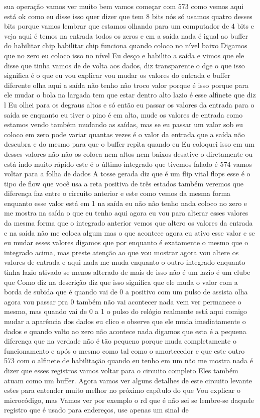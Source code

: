 \documentclass[oneside,11pt]{memoir} %
\begin{document}
sua operação  vamos ver  muito bem vamos começar com 573 como vemos  aqui está ok como eu disse isso quer dizer  que tem 8 bits nós só  usamos quatro desses bits porque  vamos lembrar que estamos olhando para um  computador de 4 bits e veja aqui é  temos na entrada todos os zeros e em  a saída nada é igual ao buffer do  habilitar chip habilitar chip  funciona quando coloco no nível baixo  Digamos que no zero eu coloco isso no nível  Eu desço e habilito a saída  e vimos que ele disse que tinha vamos de  de volta aos dados, diz transparente  o dge o que isso significa  é o que eu vou explicar  vou mudar os valores do  entrada e buffer diferente  olha aqui a saída  não tenho não troco valor  porque é isso porque para ele mudar o  bola na largada tem que estar dentro  alto lazio é esse alfinete que diz l  Eu olhei para os degraus altos e só então eu  passar os valores da entrada para o  saída se enquanto eu tiver o pino é  em alta, mude os valores de entrada  como estamos vendo também mudando  as saídas, mas se eu passar um valor  sob eu coloco em zero pode variar  quantas vezes é o valor da entrada  que a saída não descubra e do mesmo  para que o buffer repita quando eu  Eu coloquei isso em um desses valores não  não os coloca nem altos nem baixos  desative-o diretamente  ou está indo muito rápido  este é o último integrado que tivemos  falado é 574  vamos voltar para a folha de dados  A tosse gerada diz que é um flip vital  flops esse é o tipo de flow que você usa  a reta positiva de três estados  também veremos que diferença faz  entre o circuito anterior e este  como vemos da mesma forma enquanto  esse valor está em 1 na saída eu não  não tenho nada coloco no zero e me mostra  na saída o que eu tenho aqui agora eu vou  para alterar esses valores  da mesma forma que o integrado  anterior vemos que altero os valores  da entrada e na saída não me coloca  algum  mas o que acontece agora eu ativo esse valor  e se eu mudar esses valores digamos que  por enquanto é exatamente o mesmo que o  integrado acima, mas preste atenção  ao que vou mostrar agora vou  altere os valores de entrada e aqui  nada me muda enquanto o outro  integrado enquanto tinha lazio  ativado se menos alterado de mais de  isso não é um lazio é um clube que  Como diz na descrição diz que  isso significa que ele muda o valor com  a borda de subida que é quando  vai de 0 a positivo com um pulso de  assista olha agora vou passar pra  0 também não vai acontecer nada vem ver  permanece o mesmo, mas quando vai de 0 a 1  o pulso do relógio realmente está aqui comigo  mudar a aparência dos dados eu clico e  observe que ele muda imediatamente o  dados e quando volto ao zero não acontece nada  digamos que esta é a pequena diferença  que na verdade não é tão pequeno porque  muda completamente o funcionamento e  após o mesmo como tal como o  amortecedor  e que este outro 573 com o alfinete de  habilitação quando eu tenho em um não  me mostra nada é dizer que esses  registros vamos voltar para o circuito completo  Eles também atuam como um buffer.  Agora vamos ver alguns detalhes de  este circuito levante estes para entender  muito melhor no próximo capítulo do que  Vou explicar o microcódigo, mas  Vamos ver por exemplo o rd que é não sei se  lembre-se daquele registro que é usado  para endereços, use apenas um  sinal de 
\end{document}

